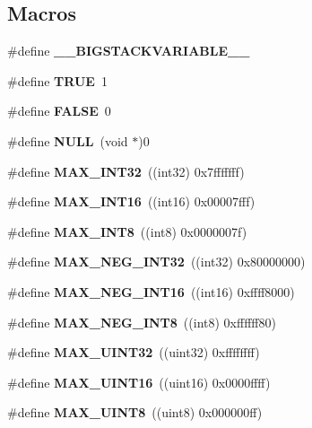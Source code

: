 \subsection*{Macros}
\begin{DoxyCompactItemize}
\item 
\mbox{\label{prim__type_8h_a64d603953ff96570ac4072daaeaeb36b}} 
\#define {\bfseries \+\_\+\+\_\+\+B\+I\+G\+S\+T\+A\+C\+K\+V\+A\+R\+I\+A\+B\+L\+E\+\_\+\+\_\+}
\item 
\mbox{\label{prim__type_8h_aa8cecfc5c5c054d2875c03e77b7be15d}} 
\#define {\bfseries T\+R\+UE}~1
\item 
\mbox{\label{prim__type_8h_aa93f0eb578d23995850d61f7d61c55c1}} 
\#define {\bfseries F\+A\+L\+SE}~0
\item 
\mbox{\label{prim__type_8h_a070d2ce7b6bb7e5c05602aa8c308d0c4}} 
\#define {\bfseries N\+U\+LL}~(void $\ast$)0
\item 
\mbox{\label{prim__type_8h_aac62d87844689a18b6f5339a89ed6e7f}} 
\#define {\bfseries M\+A\+X\+\_\+\+I\+N\+T32}~((int32) 0x7fffffff)
\item 
\mbox{\label{prim__type_8h_a3905e54374e49708219791e7d59c60fb}} 
\#define {\bfseries M\+A\+X\+\_\+\+I\+N\+T16}~((int16) 0x00007fff)
\item 
\mbox{\label{prim__type_8h_aa092b7d509790c28edc065b23de6e39e}} 
\#define {\bfseries M\+A\+X\+\_\+\+I\+N\+T8}~((int8)  0x0000007f)
\item 
\mbox{\label{prim__type_8h_a29962133c3b9c5c2cf72f7d9299fd4a0}} 
\#define {\bfseries M\+A\+X\+\_\+\+N\+E\+G\+\_\+\+I\+N\+T32}~((int32) 0x80000000)
\item 
\mbox{\label{prim__type_8h_a4338527c828e68762d8b40e01f0e0869}} 
\#define {\bfseries M\+A\+X\+\_\+\+N\+E\+G\+\_\+\+I\+N\+T16}~((int16) 0xffff8000)
\item 
\mbox{\label{prim__type_8h_a76a3e608c93aff0ad98b3b742c51d38f}} 
\#define {\bfseries M\+A\+X\+\_\+\+N\+E\+G\+\_\+\+I\+N\+T8}~((int8)  0xffffff80)
\item 
\mbox{\label{prim__type_8h_a26248174abf27973b9edfa9b70ba4c93}} 
\#define {\bfseries M\+A\+X\+\_\+\+U\+I\+N\+T32}~((uint32) 0xffffffff)
\item 
\mbox{\label{prim__type_8h_abc023544d8096a8fa1bd1f6f6f90bc41}} 
\#define {\bfseries M\+A\+X\+\_\+\+U\+I\+N\+T16}~((uint16) 0x0000ffff)
\item 
\mbox{\label{prim__type_8h_a05682ca8de174141447ff05a2289a27c}} 
\#define {\bfseries M\+A\+X\+\_\+\+U\+I\+N\+T8}~((uint8)  0x000000ff)
\item 

\end{DoxyCompactItemize}
